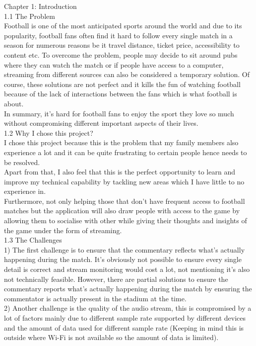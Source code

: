 \documentclass{article}
\begin{document}
\begin{flushleft}
{\huge Chapter 1: Introduction}\\[0.5cm]
{\Large 1.1 The Problem}\\
Football is one of the most anticipated sports around the world and due to its popularity, football fans often find it hard to follow every single match in a season for numerous reasons be it travel distance, ticket price, accessibility to content etc. To overcome the problem, people may decide to sit around pubs where they can watch the match or if people have access to a computer, streaming from different sources can also be considered a temporary solution. Of course, these solutions are not perfect and it kills the fun of watching football because of the lack of interactions between the fans which is what football is about.\\
In summary, it's hard for football fans to enjoy the sport they love so much without compromising different important aspects of their lives.\\
{\Large 1.2 Why I chose this project?}\\
I chose this project because this is the problem that my family members also experience a lot and it can be quite frustrating to certain people hence needs to be resolved.\\
Apart from that, I also feel that this is the perfect opportunity to learn and improve my technical capability by tackling new areas which I have little to no experience in.\\
Furthermore, not only helping those that don't have frequent access to football matches but the application will also draw people with access to the game by allowing them to socialise with other while giving their thoughts and insights of the game under the form of streaming.\\
{\Large 1.3 The Challenges}\\
1) The first challenge is to ensure that the commentary reflects what's actually happening during the match. It's obviously not possible to ensure every single detail is correct and stream monitoring would cost a lot, not mentioning it's also not technically feasible. However, there are partial solutions to ensure the commentary reports what's actually happening during the match by ensuring the commentator is actually present in the stadium at the time.\\
2) Another challenge is the quality of the audio stream, this is compromised by a lot of factors mainly due to different sample rate supported by different devices and the amount of data used for different sample rate (Keeping in mind this is outside where Wi-Fi is not available so the amount of data is limited).\\

\end{flushleft}
\end{document}
